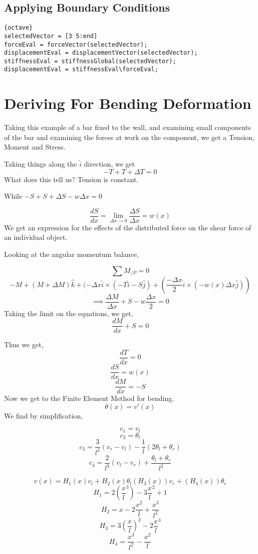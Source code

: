 \documentclass{report}
\begin{document}
\subsection{Applying Boundary Conditions}
\begin{lstlisting}{octave}
selectedVector = [3 5:end]
forceEval = forceVector(selectedVector);
displacementEval = displacementVector(selectedVector);
stiffnessEval = stiffnessGlobal(selectedVector);
displacementEval = stiffnessEval\forceEval;
\end{lstlisting}
\section{Deriving For Bending Deformation}
Taking this example of a bar fixed to the wall, and examining small components of the bar and examining the forces at work on the component, we get a Tension, Moment and Stress.

Taking things along the $\hat{i}$ direction, we get
$$
-T + T + \Delta T = 0
$$
 What does this tell us? Tension is constant. 

While $-S + S + \Delta S - w\Delta x = 0$

$$
\frac{dS}{dx} = \lim_{\Delta x \rightarrow 0} \frac{\Delta S}{\Delta x} = w(x)
$$
We get an expression for the effects of the distributed force on the shear force of an individual object.

Looking at the angular momentum balance,

$$
\sum M_{/P} = 0
$$
$$
-M + (M + \Delta M) \hat{k} + (-\Delta x \hat{i} \times(-T\hat{i} - S \hat{j}) + (\frac{-\Delta x}{2} \hat{i} \times (-w(x) \Delta x \hat{j})) $$ $$
\implies \frac{\Delta M }{\Delta x} + S - w\frac{\Delta x}{2} = 0
$$
Taking the limit on the equations, we get,
$$
\frac{dM}{dx} + S = 0
$$

Thus we get,
$$
\frac{dT}{dx} = 0
$$
$$
\frac{dS}{dx} = w(x)
$$
$$
\frac{dM}{dx} = -S
$$
Now we get to the Finite Element Method for bending.
$$
\theta(x) = v'(x)
$$
We find by simplification,

$$
c_1 = v_l 
$$
$$
c_2 = \theta_l
$$
$$
c_3 = \frac{3}{l^2}(v_r-v_l) - \frac{1}{l} (2\theta_l + \theta_r)
$$
$$
c_4 = \frac{2}{l^3} (v_l-v_r) + \frac{\theta_l+\theta_r}{l^2}
$$

$$
v(x) = H_1(x) v_l + H_2(x)\theta_l (H_3(x)) v_r + (H_4(x)) \theta_r
$$
$$
H_1 = 2(\frac{x}{l}^3) - 3\frac{x}{l}^2 + 1
$$
$$
H_2 = x-2\frac{x^2}{l} + \frac{x^3}{l^2}
$$
$$
H_3 = 3(\frac{x}{l})^2 -2\frac{x}{l}^3
$$
$$
H_4 = \frac{x^3}{l^2} - \frac{x^2}{l}
$$
\end{document}
